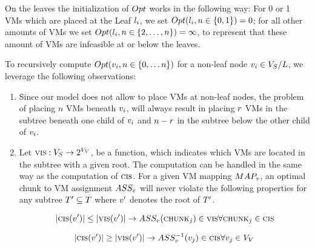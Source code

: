 On the leaves the initialization of $Opt$ works in the following way: For 0 or 
1 VMs which are placed at the Leaf $l_i$, we set $Opt(l_i, n \in 
\{0,1\}) = 0$; for all other amounts of VMs we set $Opt(l_i, n \in 
\{2,\dots,n\}) = \infty$, to represent that these amount of VMs are 
infeasible at or below the leaves.

To recursively compute $Opt(v_i, n \in \{0,\dots n\})$ for a 
non-leaf node $v_i \in V_S / L$, we leverage the 
following observations: 

\begin{enumerate}
 \item Since our model does not allow to place VMs at non-leaf nodes, 
the problem of placing $n$ VMs beneath $v_i$, will always result in
placing $r$ VMs in the subtree 
beneath one child of $v_i$ and $n - r$ in the subtree below 
the other child of $v_i$. 
\item Let $\textsc{vis} : V_S \rightarrow 2^{V_V}$, be a 
function, which indicates which VMs are located in the subtree with a given 
root. The computation can be handled in the same way as the computation of 
$\textsc{cis}$. For a given VM mapping $MAP_v$, an optimal chunk to VM 
assignment $ASS_v$ will never violate the following properties for 
any subtree $T' \subseteq T$ where $v'$ denotes the root of 
$T'$.

$$ |\textsc{cis}(v')| \leq |\textsc{vis}(v')| \rightarrow 
ASS_v(\textsc{chunk}_j) \in \textsc{vis} \forall \textsc{chunk}_j \in \textsc{cis}$$

$$ |\textsc{cis}(v')| \geq |\textsc{vis}(v')| \rightarrow 
ASS_v^{-1}(v_j) \in \textsc{cis} \forall v_j \in 
V_V$$
\end{enumerate}

